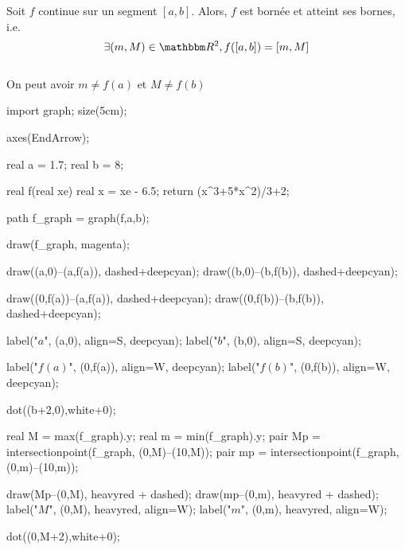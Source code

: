 \begin{thm}
	Soit $f$ continue sur un segment $[a,b]$. Alors, $f$ est bornée et atteint ses bornes, i.e. \[
		\exists (m,M) \in \R^2, f([a,b]) = [m,M]
	\]\\
	\danger On peut avoir $m \neq f(a)$ et $M \neq f(b)$
	\begin{center}
		\begin{asy}
			import graph;
			size(5cm);
			
			axes(EndArrow);

			real a = 1.7;
			real b = 8;

			real f(real xe) {
				real x = xe - 6.5;
				return (x^3+5*x^2)/3+2;
			}

			path f_graph = graph(f,a,b);

			draw(f_graph, magenta);

			draw((a,0)--(a,f(a)), dashed+deepcyan);
			draw((b,0)--(b,f(b)), dashed+deepcyan);

			draw((0,f(a))--(a,f(a)), dashed+deepcyan);
			draw((0,f(b))--(b,f(b)), dashed+deepcyan);

			label("$a$", (a,0), align=S, deepcyan);
			label("$b$", (b,0), align=S, deepcyan);

			label("$f(a)$", (0,f(a)), align=W, deepcyan);
			label("$f(b)$", (0,f(b)), align=W, deepcyan);

			dot((b+2,0),white+0);

			real M = max(f_graph).y;
			real m = min(f_graph).y;
			pair Mp = intersectionpoint(f_graph, (0,M)--(10,M));
			pair mp = intersectionpoint(f_graph, (0,m)--(10,m));

			draw(Mp--(0,M), heavyred + dashed);
			draw(mp--(0,m), heavyred + dashed);
			label("$M$", (0,M), heavyred, align=W);
			label("$m$", (0,m), heavyred, align=W);

			dot((0,M+2),white+0);
		\end{asy}
	\end{center}
\end{thm}

